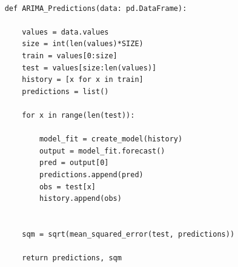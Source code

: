 \documentclass[a4paper,12pt]{article}
\begin{document}
\begin{lstlisting}[frame=single]

    def ARIMA_Predictions(data: pd.DataFrame):

        values = data.values
        size = int(len(values)*SIZE)
        train = values[0:size]
        test = values[size:len(values)]
        history = [x for x in train]
        predictions = list()
    
        for x in range(len(test)):
    
            model_fit = create_model(history)
            output = model_fit.forecast()
            pred = output[0]
            predictions.append(pred)
            obs = test[x]
            history.append(obs)
    

        sqm = sqrt(mean_squared_error(test, predictions))

        return predictions, sqm
    
\end{lstlisting}
\end{document}
